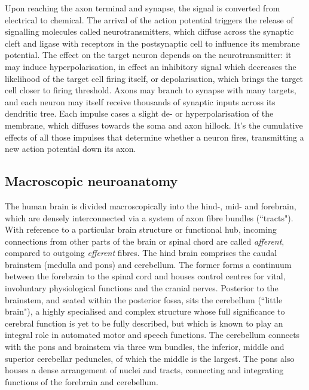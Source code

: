 Upon reaching the axon terminal and synapse, the signal is converted from electrical to chemical.
The arrival of the action potential triggers the release of signalling molecules called neurotransmitters, which diffuse across the synaptic cleft and ligase with receptors in the postsynaptic cell to influence its membrane potential.
The effect on the target neuron depends on the neurotransmitter: it may induce hyperpolarisation, in effect an inhibitory signal which decreases the likelihood of the target cell firing itself, or depolarisation, which brings the target cell closer to firing threshold.
Axons may branch to synapse with many targets, and each neuron may itself receive thousands of synaptic inputs across its dendritic tree.
Each impulse cases a slight de- or hyperpolarisation of the membrane, which diffuses towards the soma and axon hillock.
It's the cumulative effects of all those impulses that determine whether a neuron fires, transmitting a new action potential down its axon.

\subsection{Macroscopic neuroanatomy}

The human brain is divided macroscopically into the hind-, mid- and forebrain, which are densely interconnected via a system of axon fibre bundles (``tracts").
With reference to a particular brain structure or functional hub, incoming connections from other parts of the brain or spinal chord are called \textit{afferent}, compared to outgoing \textit{efferent} fibres.
The hind brain comprises the caudal brainstem (medulla and pons) and cerebellum.
The former forms a continuum between the forebrain to the spinal cord and houses control centres for vital, involuntary physiological functions and the cranial nerves.
Posterior to the brainstem, and seated within the posterior fossa, sits the cerebellum (``little brain"),
a highly specialised and complex structure whose full significance to cerebral function is yet to be fully described, but which is known to play an integral role in automated motor and speech functions.
The cerebellum connects with the pons and brainstem via three \gls{wm} bundles, the inferior, middle and superior cerebellar peduncles, of which the middle is the largest.
The pons also houses a dense arrangement of nuclei and tracts, connecting and integrating functions of the forebrain and cerebellum.
%
%   

